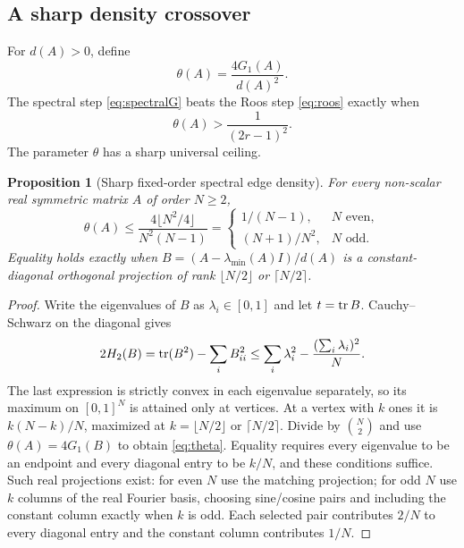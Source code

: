 \documentclass[11pt]{article}
\newtheorem{proposition}[theorem]{Proposition}
\theoremstyle{remark}\newtheorem{remark}[theorem]{Remark}
\begin{document}
\subsection{A sharp density crossover}
For $d(A)>0$, define
\[
\theta(A)=\frac{4G_1(A)}{d(A)^2}.
\]
The spectral step \eqref{eq:spectralG} beats the Roos step
\eqref{eq:roos} exactly when
\begin{equation}\label{eq:crossover}
\theta(A)>\frac1{(2r-1)^2}.
\end{equation}
The parameter $\theta$ has a sharp universal ceiling.

\begin{proposition}[Sharp fixed-order spectral edge density]\label{prop:theta}
For every non-scalar real symmetric matrix $A$ of order $N\ge2$,
\begin{equation}\label{eq:theta}
\boxed{\theta(A)\le\frac{4\lfloor N^2/4\rfloor}{N^2(N-1)}
=\begin{cases}1/(N-1),&N\text{ even},\\(N+1)/N^2,&N\text{ odd}.\end{cases}}
\end{equation}
Equality holds exactly when
$B=(A-\lambda_{\min}(A)I)/d(A)$ is a constant-diagonal orthogonal
projection of rank $\lfloor N/2\rfloor$ or $\lceil N/2\rceil$.
\end{proposition}
\begin{proof}
Write the eigenvalues of $B$ as $\lambda_i\in[0,1]$ and let $t=\operatorname{tr} B$.
Cauchy--Schwarz on the diagonal gives
\[
2H_2(B)=\operatorname{tr}(B^2)-\sum_iB_{ii}^2
\le\sum_i\lambda_i^2-\frac{(\sum_i\lambda_i)^2}{N}.
\]
The last expression is strictly convex in each eigenvalue separately, so
its maximum on $[0,1]^N$ is attained only at vertices. At a vertex with $k$
ones it is $k(N-k)/N$, maximized at $k=\lfloor N/2\rfloor$ or
$\lceil N/2\rceil$. Divide by $\binom N2$ and use
$\theta(A)=4G_1(B)$ to obtain \eqref{eq:theta}.
Equality requires every eigenvalue to be an endpoint and every diagonal
entry to be $k/N$, and these conditions suffice. Such real projections
exist: for even $N$ use the matching projection; for odd $N$ use $k$ columns
of the real Fourier basis, choosing sine/cosine pairs and including the
constant column exactly when $k$ is odd. Each selected pair contributes
$2/N$ to every diagonal entry and the constant column contributes $1/N$.
\end{proof}
\end{document}
